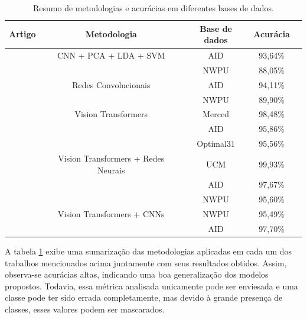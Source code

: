 \documentclass[conference]{IEEEtran}
\begin{document}
    \begin{table}[!htb]
        \centering
        \begin{tabular}{@{}ccccc@{}}
            \toprule
            \textbf{Artigo} & \textbf{Metodologia} & \textbf{Base de dados} & \textbf{Acurácia} \\ \midrule
            \cite{b4} & CNN + PCA + LDA + SVM & AID \cite{aidDataset} & 93,64\% \\
                      &                        & NWPU \cite{nwpuDataset} & 88,05\% \\ \midrule
                                              
            \cite{b3} & Redes Convolucionais & AID \cite{aidDataset} & 94,11\% \\
                     &                       & NWPU \cite{nwpuDataset} & 89,90\% \\ \midrule
                     
            \cite{b2} & Vision Transformers & Merced \cite{mercedDataset} & 98,48\% \\
                     &                      & AID \cite{aidDataset} & 95,86\% \\
                     &                      & Optimal31 \cite{optimal31Dataset} & 95,56\% \\  \midrule
                     
            \cite{b1} & Vision Transformers + Redes Neurais & UCM \cite{ucmDataset} & 99,93\% \\
                     &                                      & AID \cite{aidDataset} & 97,67\% \\
                     &                                      & NWPU \cite{nwpuDataset} & 95,60\% \\  \midrule
                     
            \cite{b0} & Vision Transformers + CNNs & NWPU \cite{nwpuDataset} & 95,49\% \\
                     &                             & AID \cite{aidDataset} & 97,70\% \\ \bottomrule
        \end{tabular}
        \caption{Resumo de metodologias e acurácias em diferentes bases de dados.}
        \label{tab:resultados_artigos}
    \end{table}

    A tabela \ref{tab:resultados_artigos} exibe uma sumarização das metodologias aplicadas em cada um dos trabalhos mencionados acima juntamente com seus resultados obtidos. Assim, observa-se acurácias altas, indicando uma boa generalização dos modelos propostos. Todavia, essa métrica analisada unicamente pode ser enviesada e uma classe pode ter sido errada completamente, mas devido à grande presença de classes, esses valores podem ser mascarados.
\end{document}
